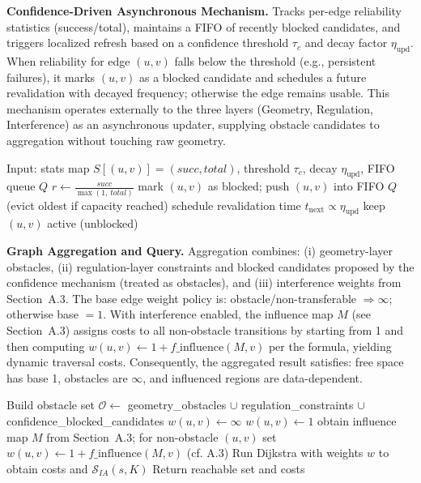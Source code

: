 \textbf{Confidence-Driven Asynchronous Mechanism.} Tracks per-edge reliability statistics (success/total), maintains a FIFO of recently blocked candidates, and triggers localized refresh based on a confidence threshold $\tau_c$ and decay factor $\eta_{\text{upd}}$. When reliability for edge $(u,v)$ falls below the threshold (e.g., persistent failures), it marks $(u,v)$ as a blocked candidate and schedules a future revalidation with decayed frequency; otherwise the edge remains usable. This mechanism operates externally to the three layers (Geometry, Regulation, Interference) as an asynchronous updater, supplying obstacle candidates to aggregation without touching raw geometry.

\begin{algorithm}[H]
\caption{Confidence-driven asynchronous update: reliability-based blocking with FIFO}
\begin{algorithmic}[1]
\STATE Input: stats map $S[(u,v)] = (succ, total)$, threshold $\tau_c$, decay $\eta_{\text{upd}}$, FIFO queue $Q$
  \STATE $r \leftarrow \frac{succ}{\max(1,\,total)}$
    \STATE mark $(u,v)$ as blocked; push $(u,v)$ into FIFO $Q$ (evict oldest if capacity reached)
    \STATE schedule revalidation time $t_{\text{next}} \propto \eta_{\text{upd}}$
  \ELSE
    \STATE keep $(u,v)$ active (unblocked)
  \ENDIF
\ENDFOR
\end{algorithmic}
\end{algorithm}

\textbf{Graph Aggregation and Query.} Aggregation combines: (i) geometry-layer obstacles, (ii) regulation-layer constraints and blocked candidates proposed by the confidence mechanism (treated as obstacles), and (iii) interference weights from Section~A.3. The base edge weight policy is: obstacle/non-transferable $\Rightarrow \infty$; otherwise base $= 1$. With interference enabled, the influence map $M$ (see Section~A.3) assigns costs to all non-obstacle transitions by starting from 1 and then computing $w(u,v) \leftarrow 1 + f\_{\text{influence}}(M, v)$ per the formula, yielding dynamic traversal costs. Consequently, the aggregated result satisfies: free space has base 1, obstacles are $\infty$, and influenced regions are data-dependent.

\begin{algorithm}[H]
\caption{Aggregate-and-Query under policy $\pi_D$ (geometry + regulation + interference)}
\begin{algorithmic}[1]
\STATE Build obstacle set $\mathcal{O} \leftarrow$ geometry\_obstacles $\cup$ regulation\_constraints $\cup$ confidence\_blocked\_candidates
   \STATE $w(u,v) \leftarrow \infty$ \ELSE \STATE $w(u,v) \leftarrow 1$ \ENDIF
\ENDFOR
{}
  \STATE obtain influence map $M$ from Section~A.3; for non-obstacle $(u,v)$ set $w(u,v) \leftarrow 1 + f\_{\text{influence}}(M, v)$ (cf. A.3)
\ENDIF
\STATE Run Dijkstra with weights $w$ to obtain costs and $\mathcal{S}_{IA}(s, K)$
\STATE Return reachable set and costs
\end{algorithmic}
\end{algorithm}

